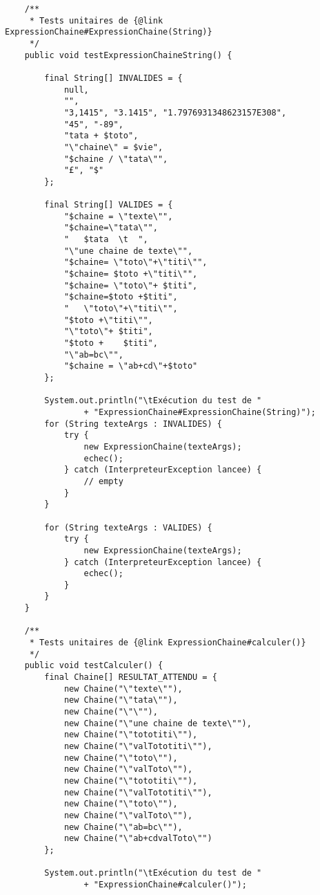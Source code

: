 \begin{enum}
\begin{verbatim}
    /**
     * Tests unitaires de {@link ExpressionChaine#ExpressionChaine(String)}
     */
    public void testExpressionChaineString() {
        
        final String[] INVALIDES = {
            null,    
            "",
            "3,1415", "3.1415", "1.7976931348623157E308",
            "45", "-89",
            "tata + $toto",
            "\"chaine\" = $vie",
            "$chaine / \"tata\"",
            "£", "$" 
        };
        
        final String[] VALIDES = {
            "$chaine = \"texte\"",  
            "$chaine=\"tata\"",
            "   $tata  \t  ",
            "\"une chaine de texte\"",
            "$chaine= \"toto\"+\"titi\"",
            "$chaine= $toto +\"titi\"",
            "$chaine= \"toto\"+ $titi",
            "$chaine=$toto +$titi",
            "   \"toto\"+\"titi\"",
            "$toto +\"titi\"",
            "\"toto\"+ $titi",
            "$toto +    $titi",
            "\"ab=bc\"",
            "$chaine = \"ab+cd\"+$toto"
        };
        
        System.out.println("\tExécution du test de "
                + "ExpressionChaine#ExpressionChaine(String)");
        for (String texteArgs : INVALIDES) {
            try {
                new ExpressionChaine(texteArgs);
                echec();
            } catch (InterpreteurException lancee) { 
                // empty
            }
        }
        
        for (String texteArgs : VALIDES) {
            try {
                new ExpressionChaine(texteArgs);
            } catch (InterpreteurException lancee) { 
                echec();
            }
        }     
    }
    
    /**
     * Tests unitaires de {@link ExpressionChaine#calculer()}
     */
    public void testCalculer() {
        final Chaine[] RESULTAT_ATTENDU = {
            new Chaine("\"texte\""),
            new Chaine("\"tata\""),
            new Chaine("\"\""),
            new Chaine("\"une chaine de texte\""),
            new Chaine("\"tototiti\""),
            new Chaine("\"valTototiti\""),
            new Chaine("\"toto\""),
            new Chaine("\"valToto\""),
            new Chaine("\"tototiti\""),
            new Chaine("\"valTototiti\""),
            new Chaine("\"toto\""),
            new Chaine("\"valToto\""),
            new Chaine("\"ab=bc\""),
            new Chaine("\"ab+cdvalToto\"")
        };
        
        System.out.println("\tExécution du test de "
                + "ExpressionChaine#calculer()");
        

\end{verbatim}
\end{enum}
